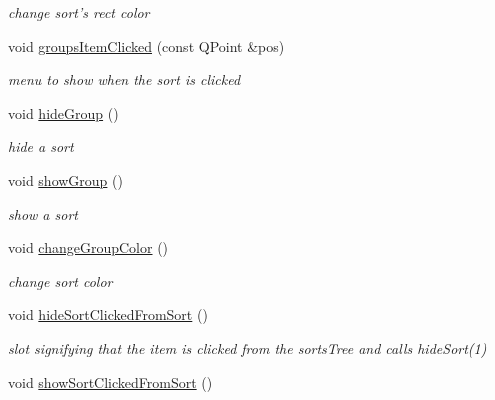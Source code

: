\begin{DoxyCompactItemize}
\begin{DoxyCompactList}\small\item\em change sort's rect color \end{DoxyCompactList}\item 
\hypertarget{class_tree_area_a1a3c713057c8aee75749706af8ad3cf6}{void \hyperlink{class_tree_area_a1a3c713057c8aee75749706af8ad3cf6}{groups\-Item\-Clicked} (const \-Q\-Point \&pos)}\label{class_tree_area_a1a3c713057c8aee75749706af8ad3cf6}

\begin{DoxyCompactList}\small\item\em menu to show when the sort is clicked \end{DoxyCompactList}\item 
\hypertarget{class_tree_area_a7ec5a5d26a01615f6cc9acac55fd745e}{void \hyperlink{class_tree_area_a7ec5a5d26a01615f6cc9acac55fd745e}{hide\-Group} ()}\label{class_tree_area_a7ec5a5d26a01615f6cc9acac55fd745e}

\begin{DoxyCompactList}\small\item\em hide a sort \end{DoxyCompactList}\item 
\hypertarget{class_tree_area_a676a80fa10cb0d43a4bef32180679c2b}{void \hyperlink{class_tree_area_a676a80fa10cb0d43a4bef32180679c2b}{show\-Group} ()}\label{class_tree_area_a676a80fa10cb0d43a4bef32180679c2b}

\begin{DoxyCompactList}\small\item\em show a sort \end{DoxyCompactList}\item 
\hypertarget{class_tree_area_ac59ce87a367e3b0657718a57b718760d}{void \hyperlink{class_tree_area_ac59ce87a367e3b0657718a57b718760d}{change\-Group\-Color} ()}\label{class_tree_area_ac59ce87a367e3b0657718a57b718760d}

\begin{DoxyCompactList}\small\item\em change sort color \end{DoxyCompactList}\item 
\hypertarget{class_tree_area_adf29861998cba6d9ae174a50c37a7fac}{void \hyperlink{class_tree_area_adf29861998cba6d9ae174a50c37a7fac}{hide\-Sort\-Clicked\-From\-Sort} ()}\label{class_tree_area_adf29861998cba6d9ae174a50c37a7fac}

\begin{DoxyCompactList}\small\item\em slot signifying that the item is clicked from the sorts\-Tree and calls hide\-Sort(1) \end{DoxyCompactList}\item 
\hypertarget{class_tree_area_a78a3ddc89efe14b41c825adb727dfdc6}{void \hyperlink{class_tree_area_a78a3ddc89efe14b41c825adb727dfdc6}{show\-Sort\-Clicked\-From\-Sort} ()}\label{class_tree_area_a78a3ddc89efe14b41c825adb727dfdc6}


\end{DoxyCompactItemize}
